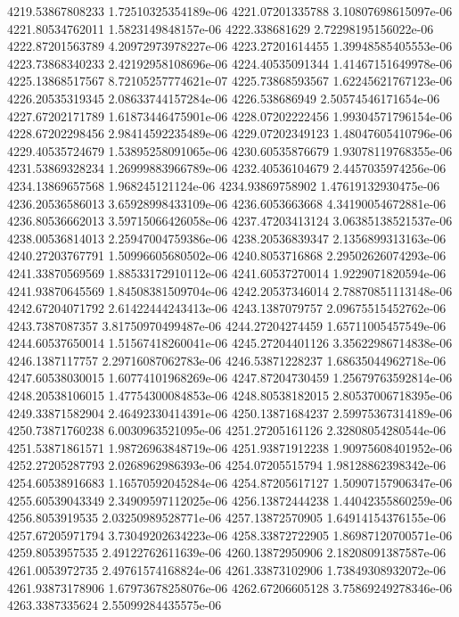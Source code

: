 {4219.53867808233 1.72510325354189e-06
4221.07201335788 3.10807698615097e-06
4221.80534762011 1.5823149848157e-06
4222.338681629 2.72298195156022e-06
4222.87201563789 4.20972973978227e-06
4223.27201614455 1.39948585405553e-06
4223.73868340233 2.42192958108696e-06
4224.40535091344 1.41467151649978e-06
4225.13868517567 8.72105257774621e-07
4225.73868593567 1.62245621767123e-06
4226.20535319345 2.08633744157284e-06
4226.538686949 2.50574546171654e-06
4227.67202171789 1.61873446475901e-06
4228.07202222456 1.99304571796154e-06
4228.67202298456 2.98414592235489e-06
4229.07202349123 1.48047605410796e-06
4229.40535724679 1.53895258091065e-06
4230.60535876679 1.93078119768355e-06
4231.53869328234 1.26999883966789e-06
4232.40536104679 2.4457035974256e-06
4234.13869657568 1.968245121124e-06
4234.93869758902 1.47619132930475e-06
4236.20536586013 3.65928998433109e-06
4236.6053663668 4.34190054672881e-06
4236.80536662013 3.59715066426058e-06
4237.47203413124 3.06385138521537e-06
4238.00536814013 2.25947004759386e-06
4238.20536839347 2.1356899313163e-06
4240.27203767791 1.50996605680502e-06
4240.8053716868 2.29502626074293e-06
4241.33870569569 1.88533172910112e-06
4241.60537270014 1.9229071820594e-06
4241.93870645569 1.84508381509704e-06
4242.20537346014 2.78870851113148e-06
4242.67204071792 2.61422444243413e-06
4243.1387079757 2.09675515452762e-06
4243.7387087357 3.81750970499487e-06
4244.27204274459 1.65711005457549e-06
4244.60537650014 1.51567418260041e-06
4245.27204401126 3.35622986714838e-06
4246.1387117757 2.29716087062783e-06
4246.53871228237 1.68635044962718e-06
4247.60538030015 1.60774101968269e-06
4247.87204730459 1.25679763592814e-06
4248.20538106015 1.47754300084853e-06
4248.80538182015 2.80537006718395e-06
4249.33871582904 2.46492330414391e-06
4250.13871684237 2.59975367314189e-06
4250.73871760238 6.0030963521095e-06
4251.27205161126 2.32808054280544e-06
4251.53871861571 1.98726963848719e-06
4251.93871912238 1.90975608401952e-06
4252.27205287793 2.0268962986393e-06
4254.07205515794 1.98128862398342e-06
4254.60538916683 1.16570592045284e-06
4254.87205617127 1.50907157906347e-06
4255.60539043349 2.34909597112025e-06
4256.13872444238 1.44042355860259e-06
4256.8053919535 2.03250989528771e-06
4257.13872570905 1.64914154376155e-06
4257.67205971794 3.73049202634223e-06
4258.33872722905 1.86987120700571e-06
4259.8053957535 2.49122762611639e-06
4260.13872950906 2.18208091387587e-06
4261.0053972735 2.49761574168824e-06
4261.33873102906 1.73849308932072e-06
4261.93873178906 1.67973678258076e-06
4262.67206605128 3.75869249278346e-06
4263.3387335624 2.55099284435575e-06
}
